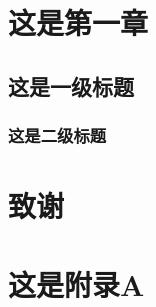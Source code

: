 \documentclass[master]{cugthesis}
\begin{document}
    \makefrontpages 
    \chapter{这是第一章}
    \section{这是一级标题}
    \subsection{这是二级标题}

    \backmatter
    \chapter{致谢}

    \appendix
    \chapter{这是附录A}
\end{document}
